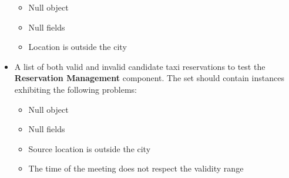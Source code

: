 \begin{itemize}
\begin{itemize}
		\item Null object
		\item Null fields
		\item Location is outside the city
		\end{itemize}
	\item A list of both valid and invalid candidate taxi reservations to test the \textbf{Reservation Management} component. The set should contain instances exhibiting the following problems: 
		\begin{itemize}
		\item Null object
		\item Null fields
		\item Source location is outside the city
		\item The time of the meeting does not respect the validity range
		\end{itemize}		
\end{itemize}